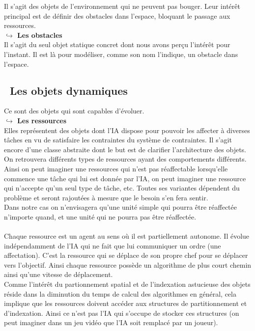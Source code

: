 Il s'agit des objets de l'environnement qui ne peuvent pas bouger. Leur intérêt principal est de définir des obstacles dans l'espace, bloquant le passage aux ressources.\\

\textbf{$\hookrightarrow$ Les obstacles}\\

Il s'agit du seul objet statique concret dont nous avons perçu l’intérêt pour l'instant. Il est là pour modéliser, comme son nom l'indique, un obstacle dans l'espace.

\subsection{\textbullet ~Les objets dynamiques}

Ce sont des objets qui sont capables d'évoluer.\\

\textbf{$\hookrightarrow$ Les ressources}\\

Elles représentent des objets dont l'IA dispose pour pouvoir les affecter à diverses tâches en vu de satisfaire les contraintes du système de contraintes. Il s'agit encore d'une classe abstraite dont le but est de clarifier l'architecture des objets. On retrouvera différents types de ressources ayant des comportements différents.\\

Ainsi on peut imaginer une ressources qui n'est pas réaffectable lorsqu'elle commence une tâche qui lui est donnée par l'IA, on peut imaginer une ressource qui n'accepte qu'un seul type de tâche, etc. Toutes ses variantes dépendent du problème et seront rajoutées à mesure que le besoin s'en fera sentir.\\
\indent Dans notre cas on n'envisagera qu'une unité simple qui pourra être réaffectée n'importe quand, et une unité qui ne pourra pas être réaffectée.\\\\

Chaque ressource est un agent au sens où il est partiellement autonome. Il évolue indépendamment de l'IA qui ne fait que lui communiquer un ordre (une affectation). C'est la ressource qui se déplace de son propre chef pour se déplacer vers l'objectif. Ainsi chaque ressource possède un algorithme de plus court chemin ainsi qu'une vitesse de déplacement.\\
Comme l'intérêt du partionnement spatial et de l'indexation astucieuse des objets réside dans la diminution du temps de calcul des algorithmes en général, cela implique que les ressources doivent accéder aux structures de partitionnement et d'indexation. Ainsi ce n'est pas l'IA qui s'occupe de stocker ces structures (on peut imaginer dans un jeu vidéo que l'IA soit remplacé par un joueur).

